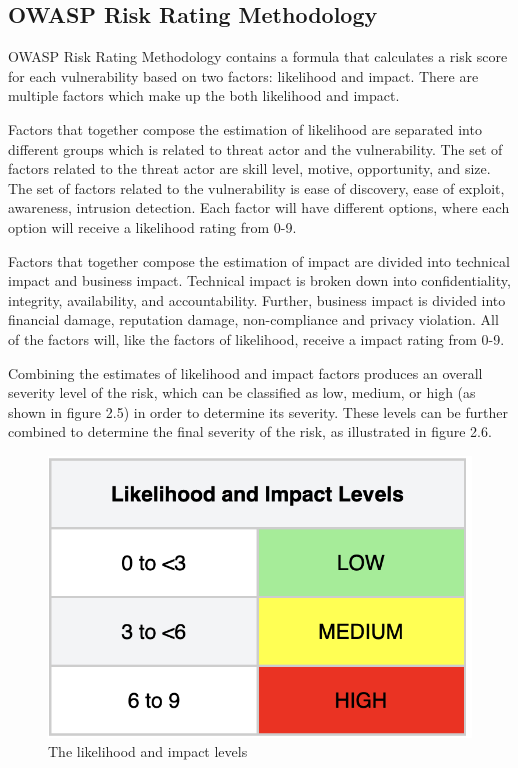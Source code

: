 \subsection{OWASP Risk Rating Methodology}
OWASP Risk Rating Methodology contains a formula  that calculates a risk score for each vulnerability based on two factors: likelihood and impact. There are multiple factors which make up the both likelihood and impact. 
 
Factors that together compose the estimation of likelihood are separated into different groups which is related to threat actor and the vulnerability. The set of factors related to the threat actor are skill level, motive, opportunity, and size. The set of factors related to the vulnerability is ease of discovery, ease of exploit, awareness, intrusion detection. Each factor will have different options, where each option will receive a likelihood rating from 0-9. 

Factors that together compose the estimation of impact are divided into technical impact and business impact. Technical impact is broken down into confidentiality, integrity, availability, and accountability. Further, business impact is divided into financial damage, reputation damage, non-compliance and privacy violation. All of the factors will, like the factors of likelihood, receive a impact rating from 0-9. 

Combining the estimates of likelihood and impact factors produces an overall severity level of the risk, which can be classified as low, medium, or high (as shown in figure 2.5) in order to determine its severity. These levels can be further combined to determine the final severity of the risk, as illustrated in figure 2.6.\cite{owasprisk}

\begin{figure}[H]
    \centering
    \includegraphics[scale=0.5]{Images/OWASP-likelihood.png}
    \caption{The likelihood and impact levels}
    \label{fig:Impact levels}
\end{figure}

